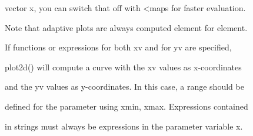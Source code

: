 \documentclass[
]{book}
\begin{document}
vector x, you can switch that off with \textless maps for faster evaluation.

Note that adaptive plots are always computed element for element.

If functions or expressions for both xv and for yv are specified,

plot2d() will compute a curve with the xv values as x-coordinates

and the yv values as y-coordinates. In this case, a range should be

defined for the parameter using xmin, xmax. Expressions contained

in strings must always be expressions in the parameter variable x.

\backmatter
\end{document}
